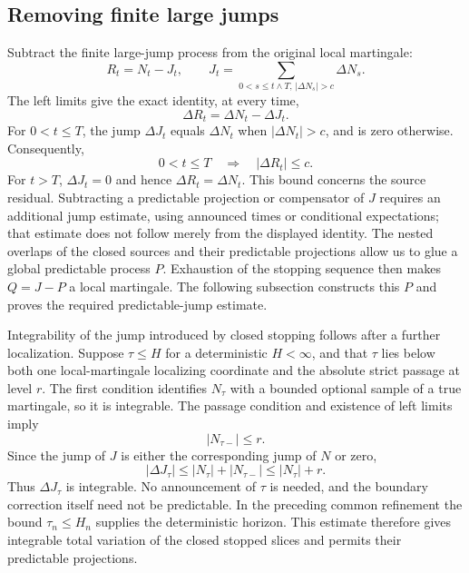 \subsection{Removing finite large jumps}
Subtract the finite large-jump process from the original local martingale:
\[
 R_t=N_t-J_t,\qquad
 J_t=\sum_{0<s\leq t\wedge T,\,|\Delta N_s|>c}\Delta N_s.
\]
The left limits give the exact identity, at every time,
\[
 \Delta R_t=\Delta N_t-\Delta J_t.
\]
For $0<t\leq T$, the jump $\Delta J_t$ equals $\Delta N_t$ when
$|\Delta N_t|>c$, and is zero otherwise. Consequently,
\[
 0<t\leq T\quad\Longrightarrow\quad |\Delta R_t|\leq c.
\]
For $t>T$, $\Delta J_t=0$ and hence $\Delta R_t=\Delta N_t$.
This bound concerns the source residual. Subtracting a predictable
projection or compensator of $J$ requires an additional jump estimate,
using announced times or conditional expectations; that estimate does not
follow merely from the displayed identity. The nested overlaps of the
closed sources and their predictable projections allow us to glue a global
predictable process $P$. Exhaustion of the stopping sequence then makes
$Q=J-P$ a local martingale. The following subsection constructs this $P$
and proves the required predictable-jump estimate.

Integrability of the jump introduced by closed stopping follows after a
further localization. Suppose $\tau\leq H$ for a deterministic $H<\infty$,
and that $\tau$ lies below both one local-martingale localizing coordinate
and the absolute strict passage at level $r$. The first condition identifies
$N_\tau$ with a bounded optional sample of a true martingale, so it is
integrable. The passage condition and existence of left limits imply
\[
 |N_{\tau-}|\leq r.
\]
Since the jump of $J$ is either the corresponding jump of $N$ or zero,
\[
 |\Delta J_\tau|
 \leq |N_\tau|+|N_{\tau-}|
 \leq |N_\tau|+r.
\]
Thus $\Delta J_\tau$ is integrable. No announcement of $\tau$ is needed,
and the boundary correction itself need not be predictable.
In the preceding common refinement the bound $\tau_n\leq H_n$ supplies
the deterministic horizon. This estimate therefore gives integrable total
variation of the closed stopped slices and permits their predictable projections.
